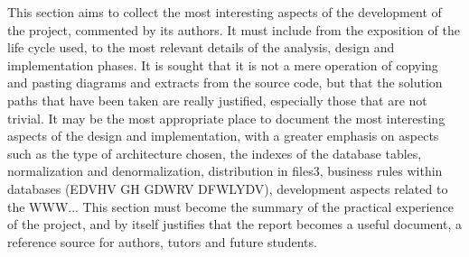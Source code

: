 
\nonzeroparskip This section aims to collect the most interesting aspects of the development of the project, commented by its authors.
It must include from the exposition of the life cycle used, to the most relevant details of the analysis, design and implementation phases.
It is sought that it is not a mere operation of copying and pasting diagrams and extracts from the source code, but that the solution paths that have been taken are really justified, especially those that are not trivial.
It may be the most appropriate place to document the most interesting aspects of the design and implementation, with a greater emphasis on aspects such as the type of architecture chosen, the indexes of the database tables, normalization and denormalization, distribution in files3, business rules within databases (EDVHV GH GDWRV DFWLYDV), development aspects related to the WWW...
This section must become the summary of the practical experience of the project, and by itself justifies that the report becomes a useful document, a reference source for authors, tutors and future students.
